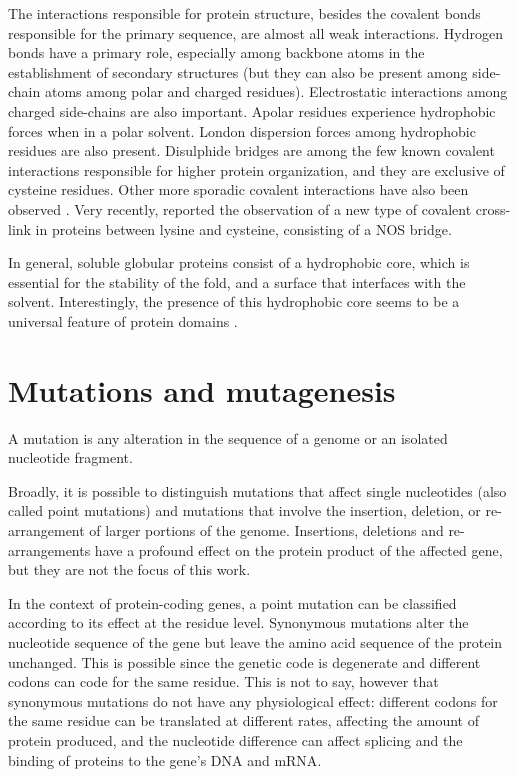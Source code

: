 The interactions responsible for protein structure, besides the covalent bonds responsible for the primary sequence, are almost all weak interactions.
Hydrogen bonds have a primary role, especially among backbone atoms in the establishment of secondary structures (but they can also be present among side-chain atoms among polar and charged residues).
Electrostatic interactions among charged side-chains are also important.
Apolar residues experience hydrophobic forces when in a polar solvent.
London dispersion forces among hydrophobic residues are also present.
Disulphide bridges are among the few known covalent interactions responsible for higher protein organization, and they are exclusive of cysteine residues.
Other more sporadic covalent interactions have also been observed \parencite[][for example]{Ito1991}.
Very recently, \textcite{Wensien2021} reported the observation of a new type of covalent cross-link in proteins between lysine and cysteine, consisting of a NOS bridge.

In general, soluble globular proteins consist of a hydrophobic core, which is essential for the stability of the fold, and a surface that interfaces with the solvent.
Interestingly, the presence of this hydrophobic core seems to be a universal feature of protein domains \parencite{Kalinowska2017}.

\section{Mutations and mutagenesis}
A mutation is any alteration in the sequence of a genome or an isolated nucleotide fragment.

Broadly, it is possible to distinguish mutations that affect single nucleotides (also called point mutations) and mutations that involve the insertion, deletion, or re-arrangement of larger portions of the genome.
Insertions, deletions and re-arrangements have a profound effect on the protein product of the affected gene, but they are not the focus of this work.

In the context of protein-coding genes, a point mutation can be classified according to its effect at the residue level.
Synonymous mutations alter the nucleotide sequence of the gene but leave the amino acid sequence of the protein unchanged.
This is possible since the genetic code is degenerate and different codons can code for the same residue.
This is not to say, however that synonymous mutations do not have any physiological effect: different codons for the same residue can be translated at different rates, affecting the amount of protein produced, and the nucleotide difference can affect splicing and the binding of proteins to the gene's DNA and mRNA\@ \parencite{Hunt2014}.

